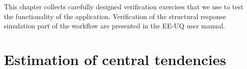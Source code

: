 This chapter collects carefully designed verification exercises that we use to test the functionality of the \texttt{\getsoftwarename{}} application. Verification of the structural response simulation part of the workflow are presented in the EE-UQ user manual.\\

\section{Estimation of central tendencies}
